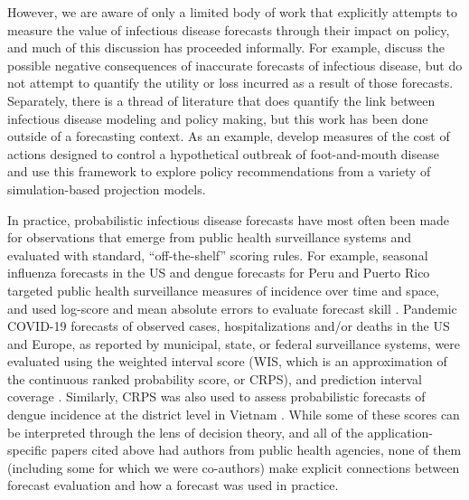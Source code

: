 \documentclass{article}
\begin{document}


However, we are aware of only a limited body of work that explicitly attempts to measure the value of infectious disease forecasts through their impact on policy, and much of this discussion has proceeded informally. For example, \cite{ioannidis2022forecastingCOVIDfailed} discuss the possible negative consequences of inaccurate forecasts of infectious disease, but do not attempt to quantify the utility or loss incurred as a result of those forecasts. Separately, there is a thread of literature that does quantify the link between infectious disease modeling and policy making, but this work has been done outside of a forecasting context. As an example, \cite{Probert2016decisionMakingFootMouth} develop measures of the cost of actions designed to control a hypothetical outbreak of foot-and-mouth disease and use this framework to explore policy recommendations from a variety of simulation-based projection models.

In practice, probabilistic infectious disease forecasts have most often been made for observations that emerge from public health surveillance systems and evaluated with standard, ``off-the-shelf'' scoring rules.
For example, seasonal influenza forecasts in the US and dengue forecasts for Peru and Puerto Rico targeted public health surveillance measures of incidence over time and space, and used log-score and mean absolute errors to evaluate forecast skill \citep{mcgowan_collaborative_2019,reich_collaborative_2019,johansson_open_2019}.
Pandemic COVID-19 forecasts of observed cases, hospitalizations and/or deaths in the US and Europe, as reported by municipal, state, or federal surveillance systems, were evaluated using the weighted interval score (WIS, which is an approximation of the continuous ranked probability score, or CRPS), and prediction interval coverage \citep{cramer_evaluation_2022,fox_real-time_2022,sherratt2023predictive}.
Similarly, CRPS was also used to assess probabilistic forecasts of dengue incidence at the district level in Vietnam \citep{colon-gonzalez_probabilistic_2021}.
While some of these scores can be interpreted through the lens of decision theory, and all of the application-specific papers cited above had authors from public health agencies, none of them (including some for which we were co-authors) make explicit connections between forecast evaluation and how a forecast was used in practice.
\end{document}
